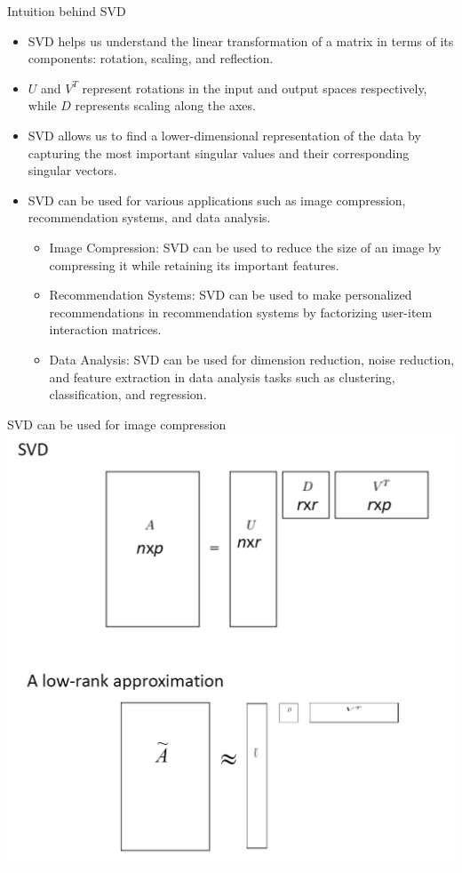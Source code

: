 \documentclass[
  ignorenonframetext,
]{beamer}
\providecommand{\tightlist}{%
  \setlength{\itemsep}{0pt}\setlength{\parskip}{0pt}}
\begin{document}
\begin{frame}{Intuition behind SVD}
\protect\hypertarget{intuition-behind-svd}{}
\begin{itemize}
\tightlist
\item
  SVD helps us understand the linear transformation of a matrix in terms
  of its components: rotation, scaling, and reflection.
\item
  \(U\) and \(V^T\) represent rotations in the input and output spaces
  respectively, while \(D\) represents scaling along the axes.
\item
  SVD allows us to find a lower-dimensional representation of the data
  by capturing the most important singular values and their
  corresponding singular vectors.
\item
  SVD can be used for various applications such as image compression,
  recommendation systems, and data analysis.

  \begin{itemize}
  \tightlist
  \item
    Image Compression: SVD can be used to reduce the size of an image by
    compressing it while retaining its important features.
  \item
    Recommendation Systems: SVD can be used to make personalized
    recommendations in recommendation systems by factorizing user-item
    interaction matrices.
  \item
    Data Analysis: SVD can be used for dimension reduction, noise
    reduction, and feature extraction in data analysis tasks such as
    clustering, classification, and regression.
  \end{itemize}
\end{itemize}
\end{frame}

\begin{frame}{SVD can be used for image compression}
\protect\hypertarget{svd-can-be-used-for-image-compression}{}
\includegraphics[width=0.6\linewidth]{img/SVD_Approx}
\end{frame}
\end{document}
